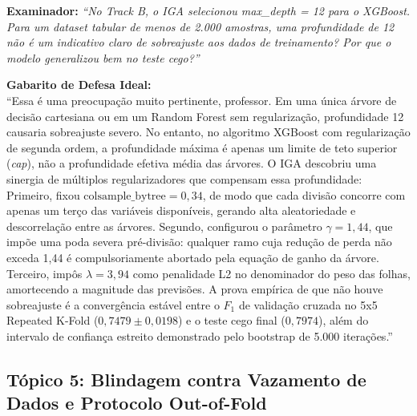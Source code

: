 \documentclass[10pt,a4paper]{article}
\begin{document}
\begin{alertbox}
\textbf{Examinador:} \textit{``No Track B, o IGA selecionou max\_depth = 12 para o XGBoost. Para um dataset tabular de menos de 2.000 amostras, uma profundidade de 12 não é um indicativo claro de sobreajuste aos dados de treinamento? Por que o modelo generalizou bem no teste cego?''}

\textbf{Gabarito de Defesa Ideal:}\\
``Essa é uma preocupação muito pertinente, professor. Em uma única árvore de decisão cartesiana ou em um Random Forest sem regularização, profundidade 12 causaria sobreajuste severo.
No entanto, no algoritmo XGBoost com regularização de segunda ordem, a profundidade máxima é apenas um limite de teto superior (\textit{cap}), não a profundidade efetiva média das árvores.
O IGA descobriu uma sinergia de múltiplos regularizadores que compensam essa profundidade:
Primeiro, fixou $\text{colsample\_bytree} = 0,34$, de modo que cada divisão concorre com apenas um terço das variáveis disponíveis, gerando alta aleatoriedade e descorrelação entre as árvores.
Segundo, configurou o parâmetro $\gamma = 1,44$, que impõe uma poda severa pré-divisão: qualquer ramo cuja redução de perda não exceda 1,44 é compulsoriamente abortado pela equação de ganho da árvore.
Terceiro, impôs $\lambda = 3,94$ como penalidade L2 no denominador do peso das folhas, amortecendo a magnitude das previsões.
A prova empírica de que não houve sobreajuste é a convergência estável entre o $F_1$ de validação cruzada no 5x5 Repeated K-Fold ($0,7479 \pm 0,0198$) e o teste cego final ($0,7974$), além do intervalo de confiança estreito demonstrado pelo bootstrap de 5.000 iterações.''
\end{alertbox}

\subsection{Tópico 5: Blindagem contra Vazamento de Dados e Protocolo Out-of-Fold}
\end{document}
